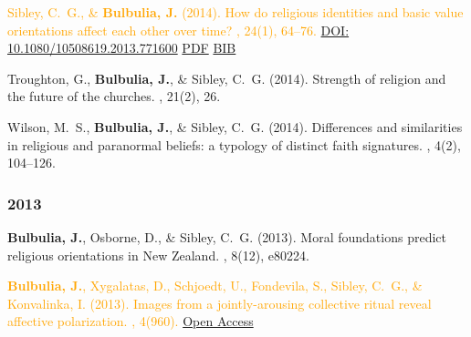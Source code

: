 \documentclass{article}
\begin{document}
\begin{thebibliography}{99}
\textcolor{Orange}{Sibley, C.~G., \& {\bf Bulbulia, J.} (2014). 
\newblock How do religious identities and basic value orientations affect each
  other over time?
,
  24(1), 64--76. 
\href{https://doi.org/10.1080/10508619.2013.771600}{DOI: 10.1080/10508619.2013.771600}}
\href{https://www.dropbox.com/s/h7gqktxwjc5z11p/10508619.2013.pdf}{PDF} 
\href{https://www.dropbox.com/s/9blm1acufkd2jrv/tandf_hjpr2024_64.bib}{BIB}


Troughton, G., {\bf Bulbulia, J.}, \& Sibley, C.~G. (2014).
\newblock Strength of religion and the future of the churches.
, 21(2), 26.


Wilson, M.~S., {\bf Bulbulia, J.}, \& Sibley, C.~G. (2014).
\newblock Differences and similarities in religious and paranormal beliefs: a
  typology of distinct faith signatures.
, 4(2), 104--126. 



\subsubsection*{2013} 



{\bf Bulbulia, J.}, Osborne, D., \& Sibley, C.~G. (2013).
\newblock Moral foundations predict religious orientations in {N}ew {Z}ealand.
, 8(12), e80224.  


\textcolor{Orange}{{\bf Bulbulia, J.}, Xygalatas, D., Schjoedt, U., Fondevila, S., Sibley, C.~G., \& 
  Konvalinka, I. (2013).
\newblock Images from a jointly-arousing collective ritual reveal affective
  polarization.
, 4(960). }
\href{http://www.frontiersin.org/evolutionary_psychology_and_neuroscience/10.3389/fpsyg.2013.00960/abstract}{Open Access}   



\end{thebibliography}
\end{document}
